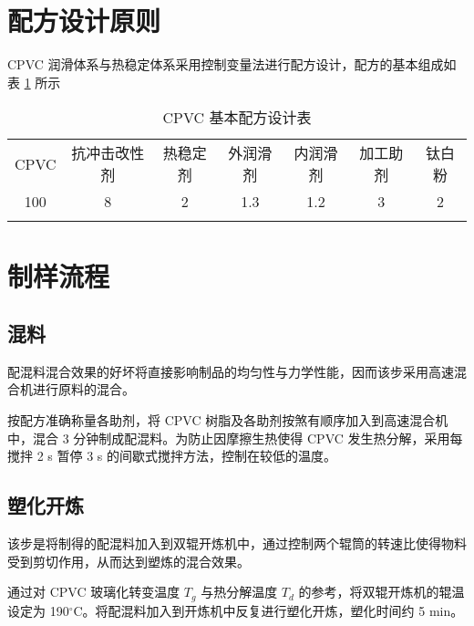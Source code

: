\documentclass[a4paper, oneside, onecolumn, 12pt]{ctexrep}    %
\newcommand{\cd}{$^{\circ}$C}  %
\begin{document}
\section{配方设计原则}
CPVC 润滑体系与热稳定体系采用控制变量法进行配方设计，配方的基本组成如表 \ref{tab2} 所示

\begin{table}[htbp]
    \caption{CPVC 基本配方设计表}
    \label{tab2}
    \begin{center}
    \footnotesize{
        \begin{tabular}{ccccccc}
            \Xhline{1pt}
            CPVC & 抗冲击改性剂 & 热稳定剂\footnotemark[1] & 外润滑剂\footnotemark[2] & 内润滑剂\footnotemark[3] & 加工助剂 & 钛白粉 \\
            \Xhline{0.5pt}
            100\footnotemark[4] & 8 & 2 & 1.3 & 1.2 & 3 & 2   \\
            \Xhline{1pt}
        \end{tabular}
    }
    \end{center}
\end{table}

\section{制样流程}

\subsection{混料}
配混料混合效果的好坏将直接影响制品的均匀性与力学性能，因而该步采用高速混合机进行原料的混合。\par
按配方准确称量各助剂，将 CPVC 树脂及各助剂按煞有顺序加入到高速混合机中，混合 3 分钟制成配混料。为防止因摩擦生热使得 CPVC 发生热分解，采用每搅拌 2 s 暂停 3 s 的间歇式搅拌方法，控制在较低的温度。

\subsection{塑化开炼}
该步是将制得的配混料加入到双辊开炼机中，通过控制两个辊筒的转速比使得物料受到剪切作用，从而达到塑炼的混合效果。\par
通过对 CPVC 玻璃化转变温度 $T_g$ 与热分解温度 $T_d$ 的参考，将双辊开炼机的辊温设定为 190\cd。将配混料加入到开炼机中反复进行塑化开炼，塑化时间约 5 min。
\end{document}
